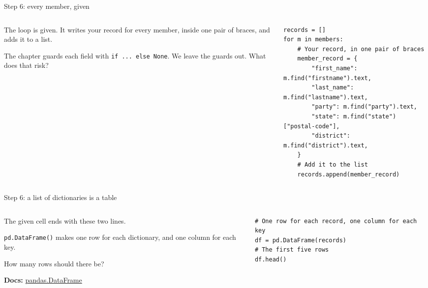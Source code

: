 \documentclass[9pt,aspectratio=169]{beamer}
\begin{document}
\begin{frame}[fragile]{Step 6: every member, given}
    \begin{columns}[T]
        \begin{column}{0.37\textwidth}
            The loop is given. It writes your record for every member, inside one pair of braces, and adds it to a list.

            \medskip
            The chapter guards each field with \texttt{if ... else None}. We leave the guards out. What does that risk?
        \end{column}
        \begin{column}{0.6\textwidth}
\begin{lstlisting}
records = []
for m in members:
    # Your record, in one pair of braces
    member_record = {
        "first_name": m.find("firstname").text,
        "last_name": m.find("lastname").text,
        "party": m.find("party").text,
        "state": m.find("state")["postal-code"],
        "district": m.find("district").text,
    }
    # Add it to the list
    records.append(member_record)
\end{lstlisting}
        \end{column}
    \end{columns}
\end{frame}

\begin{frame}[fragile]{Step 6: a list of dictionaries is a table}
    \begin{columns}[T]
        \begin{column}{0.37\textwidth}
            The given cell ends with these two lines.

            \medskip
            \texttt{pd.DataFrame()} makes one row for each dictionary, and one column for each key.

            \medskip
            How many rows should there be?

            \medskip
            {\scriptsize\textbf{Docs:} \href{https://pandas.pydata.org/docs/reference/api/pandas.DataFrame.html}{pandas.DataFrame}\par}
        \end{column}
        \begin{column}{0.6\textwidth}
\begin{lstlisting}
# One row for each record, one column for each key
df = pd.DataFrame(records)
# The first five rows
df.head()
\end{lstlisting}
        \end{column}
    \end{columns}
\end{frame}
\end{document}
